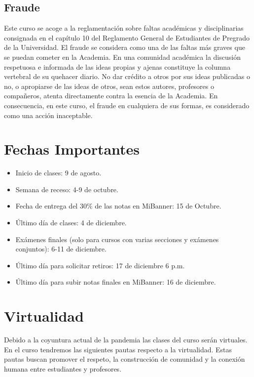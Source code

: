 \documentclass[11pt]{article}
\begin{document}
\subsection*{Fraude}
Este curso se acoge a la reglamentación sobre faltas académicas y disciplinarias consignada en el capítulo 10 del Reglamento General de Estudiantes de Pregrado de la Universidad.
El fraude se considera como una de las faltas más graves que se puedan cometer en la Academia. En una comunidad académica la discusión respetuosa e informada de las ideas propias y ajenas constituye la columna vertebral de su quehacer diario. No dar crédito a otros por sus ideas publicadas o no, o apropiarse de las ideas de otros, sean estos autores, profesores o compañeros, atenta directamente contra la esencia de la Academia. En consecuencia, en este curso, el fraude en cualquiera de sus formas, es considerado como una acción inaceptable.



\section{Fechas Importantes}

\begin{itemize}
\item Inicio de clases: 9 de agosto.
\item Semana de receso: 4-9 de octubre.  
\item Fecha de entrega del 30\% de las notas en MiBanner: 15 de Octubre.
\item Último día de clases: 4 de diciembre.
\item Exámenes finales (solo para cursos con varias secciones y exámenes conjuntos): 6-11 de diciembre.
\item Último día para solicitar retiros: 17 de diciembre 6 p.m.
\item Último día para subir notas finales en MiBanner: 16 de diciembre. 


\end{itemize}


\section{Virtualidad} \label{sec:virtualidad}

Debido a la coyuntura actual de la pandemia las clases del curso serán virtuales. En el curso tendremos las siguientes pautas respecto a la virtualidad. Estas pautas buscan promover el respeto, la construcción de comunidad y la conexión humana entre estudiantes y profesores.
\end{document}
